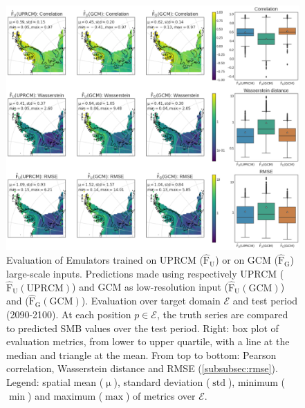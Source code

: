 \documentclass[a4paper,11pt,oneside]{report}
\begin{document}
\begin{figure}[!ht]
  \centering
  \includegraphics[width=\columnwidth]{doc/Thesis-latex/images/results/metrics_RCM_GCM.pdf}
  \caption []{\small Evaluation of Emulators trained on UPRCM ($\mathrm{\hat{F}_{U}}$) or on GCM ($\mathrm{\hat{F}_{G}}$) large-scale inputs. Predictions made using respectively UPRCM ($\mathrm{\hat{F}_{U}(UPRCM)}$) and GCM as low-resolution input ($\mathrm{\hat{F}_{U}(GCM)}$) and ($\mathrm{\hat{F}_{G}(GCM)}$). Evaluation over target domain $\mathcal{E}$ and test period (2090-2100). At each position $p \in\mathcal{E}$, the truth series are compared to predicted SMB values over the test period. Right: box plot of evaluation metrics, from lower to upper quartile, with a line at the median and triangle at the mean. From top to bottom: Pearson correlation, Wasserstein distance and RMSE (\autoref{subsubsec:rmse}). Legend: spatial mean ($\operatorname{\mu}$), standard deviation ($\operatorname{std}$), minimum ($\min$) and maximum ($\max$) of metrics over $\mathcal{E}$.}
  \vspace{-3mm}
  \label{fig:evaluation-GCM-RCM}
\end{figure}
\end{document}
